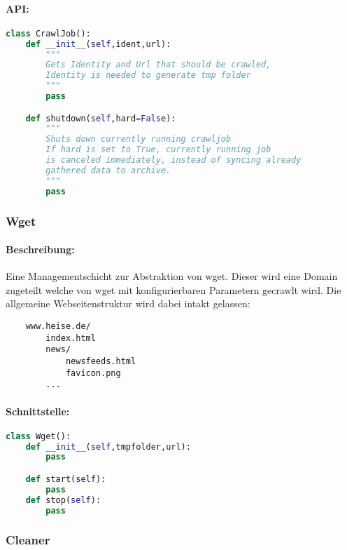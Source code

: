 \paragraph{API:}
\label{par:api_}

\begin{lstlisting}[language=python]
class CrawlJob():
    def __init__(self,ident,url):
        """
        Gets Identity and Url that should be crawled,
        Identity is needed to generate tmp folder
        """
        pass

    def shutdown(self,hard=False): 
        """
        Shuts down currently running crawljob
        If hard is set to True, currently running job
        is canceled immediately, instead of syncing already
        gathered data to archive.
        """
        pass
\end{lstlisting}

\subsubsection{Wget}
\label{ssub:wget}
\paragraph{Beschreibung:}
\label{par:beschreibung_}
Eine Managementschicht zur Abstraktion von wget.
Dieser wird eine Domain zugeteilt welche von wget mit konfigurierbaren Parametern gecrawlt wird.
Die allgemeine Webseitenstruktur wird dabei intakt gelassen:

\begin{verbatim}
    www.heise.de/
        index.html
        news/
            newsfeeds.html
            favicon.png
        ...
\end{verbatim}

\paragraph{Schnittstelle:}
\label{par:schnittstelle_}

\begin{lstlisting}[language=python]
class Wget():
    def __init__(self,tmpfolder,url):
        pass

    def start(self): 
        pass
    def stop(self):
        pass
\end{lstlisting}

\subsubsection{Cleaner}
\label{ssub:cleaner}
